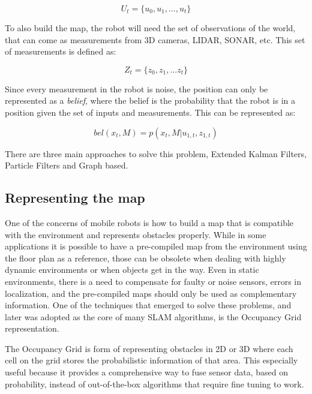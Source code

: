 \begin{equation}
    U_t = \{u_0, u_1, \dots, u_t\}
\end{equation}

To also build the map, the robot will need the set of observations of the world, that can come as measurements from 3D cameras, LIDAR, SONAR, etc. This set of measurements is defined as:

\begin{equation}
    Z_t = \{z_0, z_1, \dots z_t\}
\end{equation}

Since every measurement in the robot is noise, the position can only be represented as a \textit{belief}, where the belief is the probability that the robot is in a position given the set of inputs and measurements. This can be represented as:

\begin{equation}
    bel(x_t, M) = p(x_t, M | u_{1, t}, z_{1,t})
\end{equation}

There are three main approaches to solve this problem, Extended Kalman Filters, Particle Filters and Graph based.

\subsection{Representing the map}

One of the concerns of mobile robots is how to build a map that is compatible with the environment and represents obstacles properly. While in some applications it is possible to have a pre-compiled map from the environment using the floor plan as a reference, those can be obsolete when dealing with highly dynamic environments or when objects get in the way. Even in static environments, there is a need to compensate for faulty or noise sensors, errors in localization, and the pre-compiled maps should only be used as complementary information. One of the techniques that emerged to solve these problems, and later was adopted as the core of many SLAM algorithms, is the Occupancy Grid \cite{elfes1989using} representation.

The Occupancy Grid is form of representing obstacles in 2D or 3D where each cell on the grid stores the probabilistic information of that area. This especially useful because it provides a comprehensive way to fuse sensor data, based on probability, instead of out-of-the-box algorithms that require fine tuning to work.

